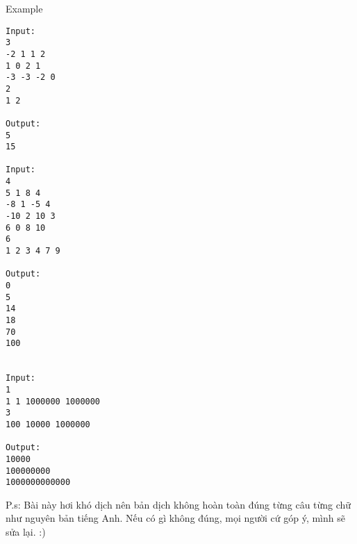 Example
\begin{verbatim}
Input:
3
-2 1 1 2
1 0 2 1
-3 -3 -2 0
2
1 2

Output:
5
15

Input:
4
5 1 8 4
-8 1 -5 4
-10 2 10 3
6 0 8 10
6
1 2 3 4 7 9

Output:
0
5
14
18
70
100


Input:
1
1 1 1000000 1000000
3
100 10000 1000000

Output:
10000
100000000
1000000000000

\end{verbatim}

   P.s: Bài này hơi khó dịch nên bản dịch không hoàn toàn đúng từng câu từng chữ như nguyên bản tiếng Anh. Nếu có gì không đúng, mọi người cứ góp ý, mình sẽ sửa lại. :)